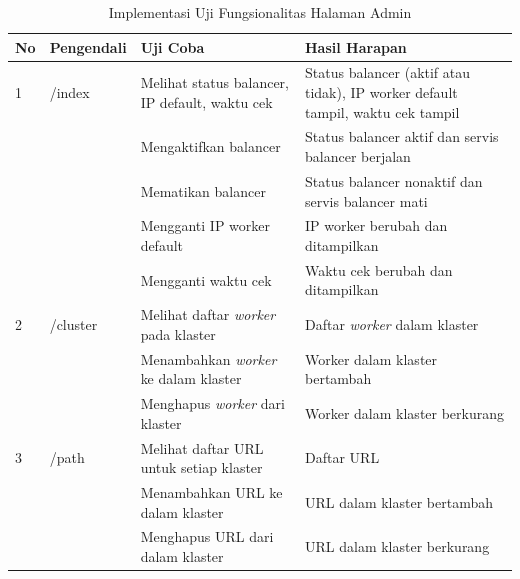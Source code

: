 \documentclass{ta-its}
\begin{document}
				\begin{longtable}{|p{}|p{}|p{}|p{}|} %
					
					\caption{Implementasi Uji Fungsionalitas Halaman Admin} \label{tabelUjiFungsionalitas} \\
					\hline
					\textbf{No} & \textbf{Pengendali} & \textbf{Uji Coba} & \textbf{Hasil Harapan} \\ \hline
					
					\endhead
					\endfoot
					\endlastfoot
					
					
					1 & /index & Melihat status balancer, IP default, waktu cek & Status balancer (aktif atau tidak), IP worker default tampil, waktu cek tampil \\ \cline{3-4}
					&& Mengaktifkan	balancer & Status balancer aktif dan servis balancer berjalan \\ \cline{3-4}
					&& Mematikan balancer & Status balancer nonaktif dan servis balancer mati \\ \cline{3-4}
					&& Mengganti IP worker default & IP worker berubah dan ditampilkan \\ \cline{3-4}
					&& Mengganti waktu cek & Waktu cek berubah dan ditampilkan \\ \hline
					2 & /cluster & Melihat daftar \textit{worker} pada klaster & Daftar \textit{worker} dalam klaster \\ \cline{3-4}
					&& Menambahkan \textit{worker} ke dalam klaster & Worker dalam klaster bertambah \\ \cline{3-4}
					&& Menghapus \textit{worker} dari klaster & Worker dalam klaster berkurang \\ \hline
					3 & /path & Melihat daftar URL untuk setiap klaster & Daftar URL \\ \cline{3-4}
					&& Menambahkan URL ke dalam klaster & URL dalam klaster bertambah \\ \cline{3-4}
					&& Menghapus URL dari dalam klaster & URL dalam klaster berkurang \\ \hline
					
				\end{longtable}
			
\end{document}
